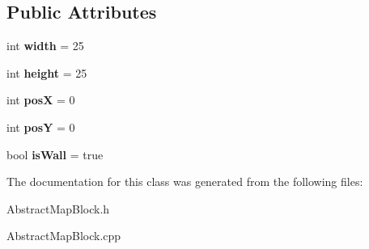\subsection*{Public Attributes}
\begin{DoxyCompactItemize}
\item 
\mbox{\label{class_abstract_map_block_afdfb3d8630fb089667c05daa27598ebb}} 
int {\bfseries width} = 25
\item 
\mbox{\label{class_abstract_map_block_ac20fe00ed32681d06378dd62e5901092}} 
int {\bfseries height} = 25
\item 
\mbox{\label{class_abstract_map_block_a5aa7d9d05727ac3b0f0f4746813d77e7}} 
int {\bfseries posX} = 0
\item 
\mbox{\label{class_abstract_map_block_a5e286fbe867af6c78c17e7e21f9948c4}} 
int {\bfseries posY} = 0
\item 
\mbox{\label{class_abstract_map_block_ae4151be3ea8a899aa9423e57262ef93e}} 
bool {\bfseries is\+Wall} = true
\end{DoxyCompactItemize}


The documentation for this class was generated from the following files\+:\begin{DoxyCompactItemize}
\item 
Abstract\+Map\+Block.\+h\item 
Abstract\+Map\+Block.\+cpp\end{DoxyCompactItemize}
